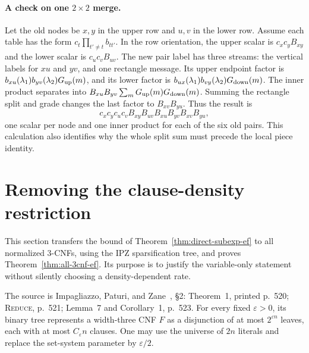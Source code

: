 \documentclass[11pt]{article}
\theoremstyle{definition}
\theoremstyle{remark}
\begin{document}
\paragraph{A check on one $2\times2$ merge.}
Let the old nodes be $x,y$ in the upper row and $u,v$ in the
lower row. Assume each table has the form
$c_t\prod_{t'\ne t}b_{tt'}$. In the row orientation, the
upper scalar is $c_xc_yB_{xy}$ and the lower scalar is
$c_uc_vB_{uv}$. The new pair label has three streams: the
vertical labels for $xu$ and $yv$, and one rectangle message.
Its upper endpoint factor is
$b_{xu}(\lambda_1)b_{yv}(\lambda_2)G_{\rm up}(m)$,
and its lower factor is
$b_{ux}(\lambda_1)b_{vy}(\lambda_2)G_{\rm down}(m)$.
The inner product separates into
$B_{xu}B_{yv}\sum_mG_{\rm up}(m)G_{\rm down}(m)$.
Summing the rectangle split and grade changes the last factor
to $B_{xv}B_{yu}$. Thus the result is
\[
 c_xc_yc_uc_v
 B_{xy}B_{uv}B_{xu}B_{yv}B_{xv}B_{yu},
\]
one scalar per node and one inner product for each of the six
old pairs. This calculation also identifies why the whole split
sum must precede the local piece identity.



\section{Removing the clause-density restriction}
\label{sec:ef-sparsification}

This section transfers the bound of
Theorem~\ref{thm:direct-subexp-ef} to all normalized 3-CNFs, using the
IPZ sparsification tree, and proves
Theorem~\ref{thm:all-3cnf-ef}. Its purpose is to justify the
variable-only statement without silently choosing a density-dependent
rate.

The source is Impagliazzo, Paturi, and Zane~\cite{ipz}, \S2:
Theorem~1, printed p.~520; \textsc{Reduce}, p.~521;
Lemma~7 and Corollary~1, p.~523. For every fixed $\varepsilon>0$,
its binary tree represents a width-three CNF $F$ as a disjunction
of at most $2^{\varepsilon n}$ leaves, each with at most
$C_\varepsilon n$ clauses. One may use the universe of $2n$
literals and replace the set-system parameter by $\varepsilon/2$.
\end{document}
